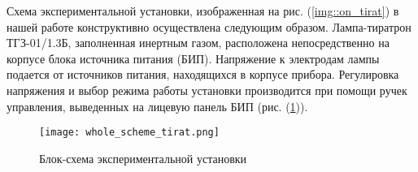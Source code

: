 Схема экспериментальной установки, изображенная на рис. (\ref{img::on_tirat}) в
нашей работе конструктивно осуществлена следующим образом. Лампа-тиратрон
ТГЗ-01/1.3Б, заполненная инертным газом, расположена непосредственно на корпусе
блока источника питания (БИП). Напряжение к электродам лампы подается от
источников питания, находящихся в корпусе прибора. Регулировка напряжения и
выбор режима работы установки производится при помощи ручек управления,
выведенных на лицевую панель БИП (рис. (\ref{img::whole_tirat})).

\begin{figure}[h!]
  \centering
  \texttt{[image: whole\_scheme\_tirat.png]}
  \caption{ {Блок-схема экспериментальной установки}}
  \label{img::whole_tirat}
\end{figure}
